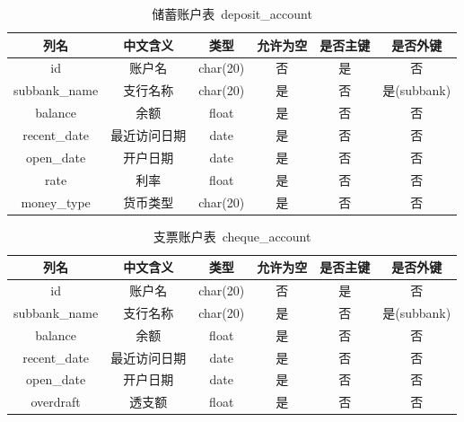 \documentclass{article}
\begin{document}
    \begin{table}[H]
        \centering
        \caption{储蓄账户表\ deposit\_account}
        \begin{tabular}{cccccc}
            \hline
            列名 & 中文含义 & 类型 & 允许为空 & 是否主键 & 是否外键 \\
            \hline
            id & 账户名 & char(20) & 否 & 是 & 否 \\
            subbank\_name & 支行名称 & char(20) & 是 & 否 & 是(subbank) \\
            balance & 余额 & float & 是 & 否 & 否 \\
            recent\_date & 最近访问日期 & date & 是 & 否 & 否 \\
            open\_date & 开户日期 & date & 是 & 否 & 否 \\
            rate & 利率 & float & 是 & 否 & 否 \\
            money\_type & 货币类型 & char(20) & 是 & 否 & 否 \\
            \hline
        \end{tabular}
    \end{table}
    \begin{table}[H]
        \centering
        \caption{支票账户表\ cheque\_account}
        \begin{tabular}{cccccc}
            \hline
            列名 & 中文含义 & 类型 & 允许为空 & 是否主键 & 是否外键 \\
            \hline
            id & 账户名 & char(20) & 否 & 是 & 否 \\
            subbank\_name & 支行名称 & char(20) & 是 & 否 & 是(subbank) \\
            balance & 余额 & float & 是 & 否 & 否 \\
            recent\_date & 最近访问日期 & date & 是 & 否 & 否 \\
            open\_date & 开户日期 & date & 是 & 否 & 否 \\
            overdraft & 透支额 & float & 是 & 否 & 否 \\
            \hline
        \end{tabular}
    \end{table}
\end{document}
